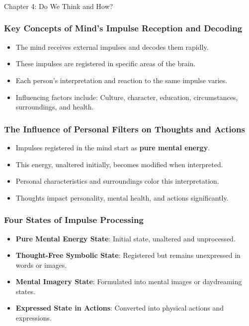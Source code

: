 \begin{frame}[fragile]\frametitle{}
\begin{center}
{\Large Chapter 4: Do We Think and How?}
\end{center}
\end{frame}


\begin{frame}[fragile]\frametitle{Key Concepts of Mind's Impulse Reception and Decoding}
    \begin{itemize}
        \item The mind receives external impulses and decodes them rapidly.
        \item These impulses are registered in specific areas of the brain.
        \item Each person's interpretation and reaction to the same impulse varies.
        \item Influencing factors include: Culture, character, education, circumstances, surroundings, and health.
    \end{itemize}
\end{frame}

\begin{frame}[fragile]\frametitle{The Influence of Personal Filters on Thoughts and Actions}
    \begin{itemize}
        \item Impulses registered in the mind start as \textbf{pure mental energy}.
        \item This energy, unaltered initially, becomes modified when interpreted.
        \item Personal characteristics and surroundings color this interpretation.
        \item Thoughts impact personality, mental health, and actions significantly.
    \end{itemize}
\end{frame}

\begin{frame}[fragile]\frametitle{Four States of Impulse Processing}
    \begin{itemize}
        \item \textbf{Pure Mental Energy State}: Initial state, unaltered and unprocessed.
        \item \textbf{Thought-Free Symbolic State}: Registered but remains unexpressed in words or images.
        \item \textbf{Mental Imagery State}: Formulated into mental images or daydreaming states.
        \item \textbf{Expressed State in Actions}: Converted into physical actions and expressions.
    \end{itemize}
\end{frame}

